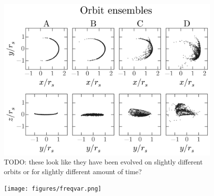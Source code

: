 \documentclass[letterpaper,12pt,preprint]{aastex}
\begin{document}
\begin{figure}[p]
\begin{center}
\includegraphics[width=\textwidth]{figures/ensembles.png}
\caption{TODO: these look like they have been evolved on slightly different orbits or for slightly different amount of time? } \label{fig:ensembles}
\end{center}
\end{figure}

\clearpage
\begin{figure}[p]
\begin{center}
\caption{ } \label{fig:ensemblemap}
\end{center}
\end{figure}

\clearpage
\begin{figure}[p]
\begin{center}
\caption{ } \label{fig:three-orbits-freqs}
\end{center}
\end{figure}

\clearpage
\begin{figure}[p]
\begin{center}
\texttt{[image: figures/freqvar.png]}
\caption{ } \label{fig:freqvar_map}
\end{center}
\end{figure}
\end{document}
